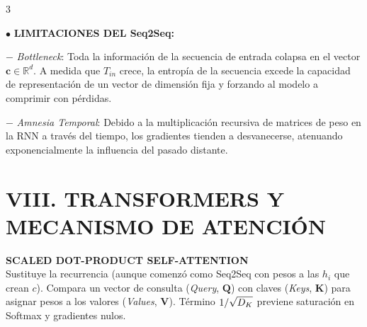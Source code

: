 \documentclass[8pt,a4paper,landscape,fleqn]{extarticle}
\begin{document}
\begin{multicols*}{3}
\begin{center}
\end{center}
\vspace{-2mm}


$\bullet$ \textbf{LIMITACIONES DEL Seq2Seq:}

$-$ \textit{Bottleneck}: Toda la información de la secuencia de entrada colapsa en el vector $\bm{c} \in \mathbb{R}^d$. A medida que $T_{in}$ crece, la entropía de la secuencia excede la capacidad de representación de un vector de dimensión fija y forzando al modelo a comprimir con pérdidas.

$-$ \textit{Amnesia Temporal}: Debido a la multiplicación recursiva de matrices de peso en la RNN a través del tiempo, los gradientes tienden a desvanecerse, atenuando exponencialmente la influencia del pasado distante.


\section{VIII. TRANSFORMERS Y MECANISMO DE ATENCIÓN}

\textbf{SCALED DOT-PRODUCT SELF-ATTENTION}\\
Sustituye la recurrencia (aunque comenzó como Seq2Seq con pesos a las $h_i$ que crean $c$). Compara un vector de consulta (\textit{Query}, $\bm{Q}$) con claves (\textit{Keys}, $\bm{K}$) para asignar pesos a los valores (\textit{Values}, $\bm{V}$). Término $1/\sqrt{\smash[b]{D_K}}$ previene saturación en Softmax y gradientes nulos.
\begin{center}
\begin{tikzpicture}[>=Stealth, font=\tiny, scale=0.8, transform shape]


\end{tikzpicture}
\end{center}
\end{multicols*}
\end{document}
